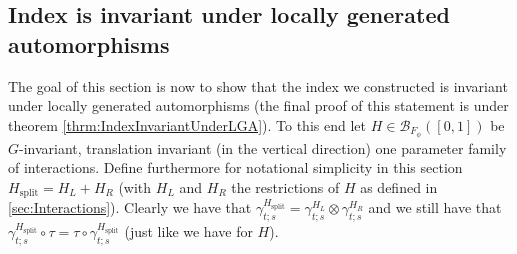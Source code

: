 \documentclass[12pt,a4paper,twoside]{article}
\newcommand{\BB}{\mathcal B}
\theoremstyle{definition}
\numberwithin{equation}{section}
\begin{document}
\subsection{Index is invariant under locally generated automorphisms}\label{sec:IndexInvariantUnderLGA}
The goal of this section is now to show that the index we constructed is invariant under locally generated automorphisms (the final proof of this statement is under theorem \ref{thrm:IndexInvariantUnderLGA}). To this end let $H\in\BB_{F_\phi}([0,1])$ be $G$-invariant, translation invariant (in the vertical direction) one parameter family of interactions. Define furthermore for notational simplicity in this section $H_{\text{split}}=H_L+H_R$ (with $H_L$ and $H_R$ the restrictions of $H$ as defined in \ref{sec:Interactions}). Clearly we have that $\gamma^{H_{\text{split}}}_{t;s}=\gamma^{H_L}_{t;s}\otimes\gamma^{H_R}_{t;s}$ and we still have that $\gamma^{H_{\text{split}}}_{t;s}\circ\tau=\tau\circ\gamma^{H_{\text{split}}}_{t;s}$ (just like we have for $H$).
\end{document}

